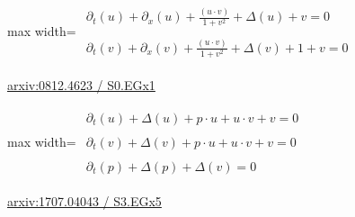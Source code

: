 \documentclass[UTF8,10pt,a4paper,fontset=mac]{ctexart}
\begin{document}
\begin{minipage}{\linewidth}\begin{center}\begin{adjustbox}{max width=\linewidth}$\displaystyle\begin{gathered}\begin{gathered}\partial_{t}(u)+\partial_{x}(u)+\frac{(u\cdot v)}{1+v^{2}}+\Delta(u)+v=0\end{gathered}\\[5pt]\begin{gathered}\partial_{t}(v)+\partial_{x}(v)+\frac{(u\cdot v)}{1+v^{2}}+\Delta(v)+1+v=0\end{gathered}\end{gathered}$\end{adjustbox}\end{center}{\small\href{https://arxiv.org/html/0812.4623#S0.EGx1}{arxiv:0812.4623 / S0.EGx1}}\par\end{minipage}\par\vspace{6mm}

\begin{minipage}{\linewidth}\begin{center}\begin{adjustbox}{max width=\linewidth}$\displaystyle\begin{gathered}\begin{gathered}\partial_{t}(u)+\Delta(u)+p\cdot u+u\cdot v+v=0\end{gathered}\\[5pt]\begin{gathered}\partial_{t}(v)+\Delta(v)+p\cdot u+u\cdot v+v=0\end{gathered}\\[5pt]\begin{gathered}\partial_{t}(p)+\Delta(p)+\Delta(v)=0\end{gathered}\end{gathered}$\end{adjustbox}\end{center}{\small\href{https://arxiv.org/html/1707.04043#S3.EGx5}{arxiv:1707.04043 / S3.EGx5}}\par\end{minipage}\par\vspace{6mm}
\end{document}

